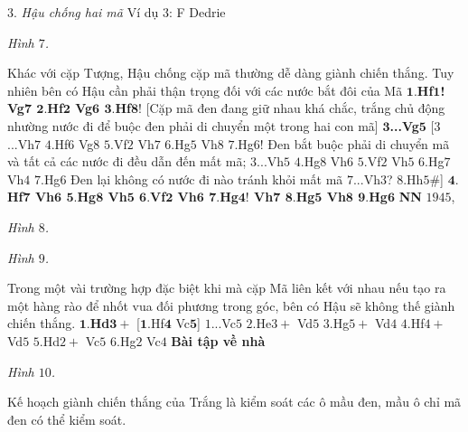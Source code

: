 \begin{multicols}{2}
	$3.$ \textit{Hậu chống hai mã}
	\vskip 0.1cm
	Ví dụ $3$: F Dedrie
	\begin{center}
		\newgame
		\scalebox{0.85}\showboard
		\vskip 0.1cm
		\textit{\small\color{gocco}Hình $7$.}
	\end{center}
	Khác với cặp Tượng, Hậu chống cặp mã thường dễ dàng  giành chiến thắng. Tuy nhiên bên có Hậu cần phải thận trọng đối với các nước bắt đôi của Mã
	$\pmb{1.}$\textbf{\color{gocco}Hf$\pmb{1}$! Vg$\pmb{7}$ $\pmb{2.}$Hf$\pmb{2}$ Vg$\pmb{6}$ $\pmb{3.}$Hf$\pmb{8!}$} [Cặp mã đen đang giữ nhau khá chắc, trắng chủ động nhường nước đi để buộc đen phải di chuyển một trong hai con mã]
	\vskip 0.1cm
	$\pmb{3}$\textbf{\color{gocco}...Vg}$\pmb{5}$ [$3$...Vh$7$ $4.$Hf$6$ Vg$8$ $5.$Vf$2$ Vh$7$ $6.$Hg$5$ Vh$8$ $7.$Hg$6!$ 
	\vskip 0.1cm
	Đen bắt buộc phải di chuyển mã và tất cả các nước đi đều dẫn đến mất mã; $3$...Vh$5$ $4.$Hg$8$ Vh$6$ $5.$Vf$2$ Vh$5$ $6.$Hg$7$ Vh$4$ $7.$Hg$6$
	\vskip 0.1cm
	Đen lại không có nước đi nào tránh khỏi mất mã $7$...Vh$3$? $8.$Hh$5\#$]
	\vskip 0.1cm
	$\pmb{4.}$\textbf{\color{gocco}Hf$\pmb{7}$ Vh$\pmb{6}$ $\pmb{5.}$Hg$\pmb{8}$ Vh$\pmb{5}$ $\pmb{6.}$Vf$\pmb{2}$ Vh$\pmb{6}$ $\pmb{7.}$Hg$\pmb{4!}$ Vh$\pmb{7}$ $\pmb{8.}$Hg$\pmb{5}$ Vh$\pmb{8}$ $\pmb{9.}$Hg$\pmb{6}$}
	\vskip 0.1cm
	\textbf{\color{gocco}NN} $1945$,
	\begin{center}
		\newgame
		\scalebox{0.85}\showboard
		\vskip 0.1cm
		\textit{\small\color{gocco}Hình $8$.}
	\end{center}
	\begin{center}
		\newgame
		\scalebox{0.85}\showboard
		\vskip 0.1cm
		\textit{\small\color{gocco}Hình $9$.}
	\end{center}
	Trong một vài trường hợp đặc biệt khi mà cặp Mã liên kết với nhau nếu tạo ra một hàng rào để nhốt vua đối phương trong góc, bên có Hậu sẽ không thế giành chiến thắng.
		\vskip 0.1cm
	$\pmb{1.}$\textbf{\color{gocco}Hd}$\pmb{3+}$ [$\pmb{1.}$Hf$\pmb{4}$ Vc$\pmb{5}$]
	\vskip 0.1cm
	$1$...Vc$5$ $2.$He$3+$ Vd$5$ $3.$Hg$5+$ Vd$4$ $4.$Hf$4+$ Vd$5$ $5.$Hd$2+$ Vc$5$ $6.$Hg$2$ Vc$4$
	\vskip 0.1cm
	\textbf{\color{gocco}Bài tập về nhà}
	\begin{center}
		\newgame
		\scalebox{0.85}\showboard
		\vskip 0.1cm
		\textit{\small\color{gocco}Hình $10$.}
	\end{center}
	Kế hoạch giành chiến thắng của Trắng là kiểm soát các ô mầu đen, mầu ô chỉ mã đen có thể kiểm soát.

\end{multicols}
